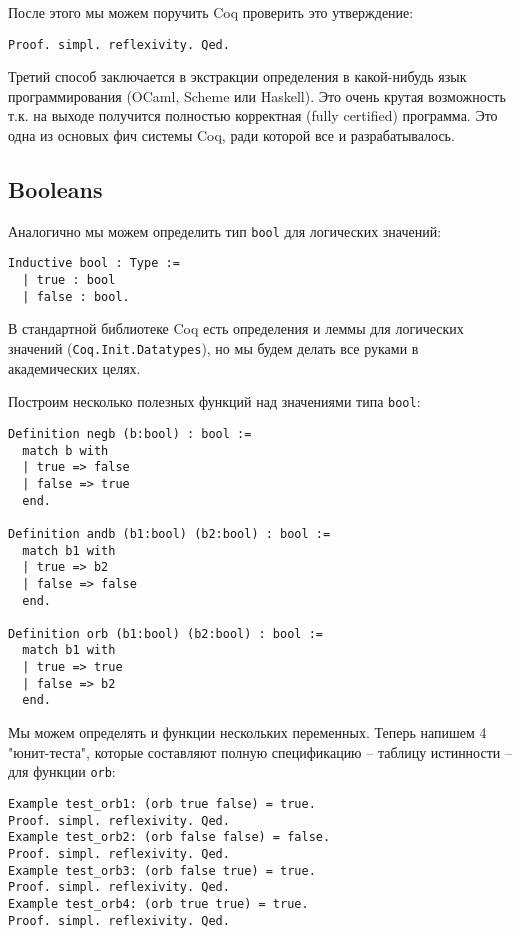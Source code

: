 \documentclass[12pt,a4paper,draft]{article}
\begin{document}
После этого мы можем поручить Coq проверить это утверждение:

\begin{verbatim}
Proof. simpl. reflexivity. Qed.
\end{verbatim}

Третий способ заключается в экстракции определения в какой-нибудь язык программирования (OCaml, Scheme или Haskell). Это очень крутая возможность т.к. на выходе получится полностью корректная (fully certified) программа. Это одна из основых фич системы Coq, ради которой все и разрабатывалось.

\subsection{Booleans}

Аналогично мы можем определить тип \texttt{bool} для логических значений:

\begin{verbatim}
Inductive bool : Type :=
  | true : bool
  | false : bool.
\end{verbatim}

В стандартной библиотеке Coq есть определения и леммы для логических значений (\texttt{Coq.Init.Datatypes}), но мы будем делать все руками в академических целях.

Построим несколько полезных функций над значениями типа \texttt{bool}:

\begin{verbatim}
Definition negb (b:bool) : bool :=
  match b with
  | true => false
  | false => true
  end.

Definition andb (b1:bool) (b2:bool) : bool :=
  match b1 with
  | true => b2
  | false => false
  end.

Definition orb (b1:bool) (b2:bool) : bool :=
  match b1 with
  | true => true
  | false => b2
  end.
\end{verbatim}

Мы можем определять и функции нескольких переменных. Теперь напишем 4 "юнит-теста", которые составляют полную спецификацию -- таблицу истинности -- для функции \texttt{orb}:

\begin{verbatim}
Example test_orb1: (orb true false) = true.
Proof. simpl. reflexivity. Qed.
Example test_orb2: (orb false false) = false.
Proof. simpl. reflexivity. Qed.
Example test_orb3: (orb false true) = true.
Proof. simpl. reflexivity. Qed.
Example test_orb4: (orb true true) = true.
Proof. simpl. reflexivity. Qed.
\end{verbatim}
\end{document}
